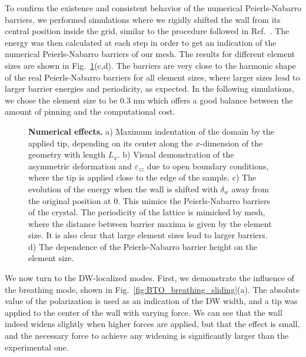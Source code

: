 To confirm the existence and consistent behavior of the numerical Peierls-Nabarro barriers, we performed simulations where we rigidly shifted the wall from its central position inside the grid, similar to the procedure followed in Ref.~\cite{Marton2018}.
The energy was then calculated at each step in order to get an indication of the numerical Peierls-Nabarro barriers of our mesh.
The results for different element sizes are shown in Fig.~\ref{fig:BTO_numerical_effects}(c,d).
The barriers are very close to the harmonic shape of the real Peierls-Nabarro barriers for all element sizes, where larger sizes lead to larger barrier energies and periodicity, as expected.
In the following simulations, we chose the element size to be 0.3 nm which offers a good balance between the amount of pinning and the computational cost. 
\begin{figure}[h!]
	\caption{\label{fig:BTO_numerical_effects}{\bf Numerical effects.} a) Maximum indentation of the domain by the applied tip, depending on its center along the $x$-dimension of the geometry with length $L_x$. b) Visual demonstration of the asymmetric deformation and $\varepsilon_{zz}$ due to open boundary conditions, where the tip is applied close to the edge of the sample. c) The evolution of the energy when the wall is shifted with $\delta_w$ away from the original position at 0. This mimics the Peierls-Nabarro barriers of the crystal. The periodicity of the lattice is mimicked by mesh, where the distance between barrier maxima is given by the element size. It is also clear that large element sizes lead to larger barriers. d) The dependence of the Peierls-Nabarro barrier height on the element size.}
\end{figure}

We now turn to the \gls{DW}-localized modes.
First, we demonstrate the influence of the breathing mode, shown in Fig.~\ref{fig:BTO_breathing_sliding}(a).
The absolute value of the polarization is used as an indication of the \gls{DW} width, and a tip was applied to the center of the wall with varying force.
We can see that the wall indeed widens slightly when higher forces are applied, but that the effect is small, and the necessary force to achieve any widening is significantly larger than the experimental one.

